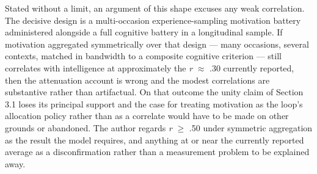 \documentclass[12pt,a4paper]{article}
\begin{document}
\begin{enumerate}
Stated without a limit, an argument of this shape excuses any weak correlation. The decisive design is a multi-occasion experience-sampling motivation battery administered alongside a full cognitive battery in a longitudinal sample. If motivation aggregated symmetrically over that design ---\hspace{0pt} many occasions, several contexts, matched in bandwidth to a composite cognitive criterion ---\hspace{0pt} still correlates with intelligence at approximately the \emph{r} $\approx$ .30 currently reported, then the attenuation account is wrong and the modest correlations are substantive rather than artifactual. On that outcome the unity claim of Section 3.1 loses its principal support and the case for treating motivation as the loop's allocation policy rather than as a correlate would have to be made on other grounds or abandoned. The author regards \emph{r} $\geq$ .50 under symmetric aggregation as the result the model requires, and anything at or near the currently reported average as a disconfirmation rather than a measurement problem to be explained away.


\end{enumerate}
\end{document}
